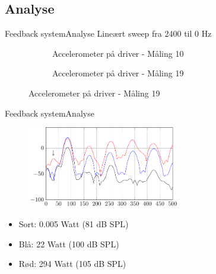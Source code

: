 \documentclass[10pt,aspectratio=169]{beamer}
\begin{document}
\subsection{Analyse}
\begin{frame}{Feedback system}{Analyse}
Lineært sweep fra 2400 til 0 Hz
\begin{figure}
\centering
\begin{subfigure}[t]{0.45\textwidth}
\centering

\caption{Accelerometer på driver - Måling 10}
\end{subfigure}
\begin{subfigure}[t]{0.45\textwidth}
\centering

\caption{Accelerometer på driver - Måling 19}
\end{subfigure}
\end{figure}
\end{frame}


\begin{frame}{Feedback system}{Analyse}
\begin{figure}
\centering
\includegraphics[width=0.6\textwidth]{FFT_hit}
\end{figure}
\begin{itemize}
\item Sort: 0.005 Watt (81 dB SPL)
\item Blå:  22 Watt (100 dB SPL)
\item Rød:  294 Watt (105 dB SPL)

\end{itemize}
\end{frame}
\end{document}
